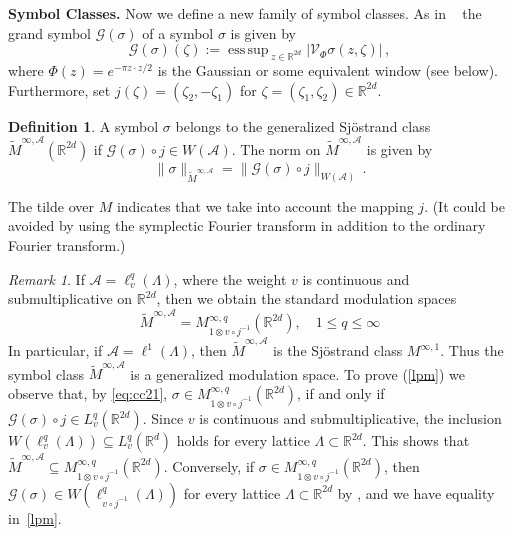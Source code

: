 \documentclass[12pt]{amsart}
\theoremstyle{definition}
\newtheorem{definition}{Definition}[section]
\theoremstyle{remark}
\newtheorem{remark}{Remark}[section]
\numberwithin{equation}{section}
\newcommand{\modsp}{modulation space}
\newcommand{\symbo}{\widetilde M^{\infty, \cA}}
\def\cG{\mathcal{G}}
\def\cA{\mathcal{A}}
\def\bR{{\mathbb{R}}}
\def\rd{\bR^d}
\def\rdd{{\bR^{2d}}}
\def\lrd{L^2(\rd)}
\def\cG{\mathcal{G}}
\def\cA{\mathcal{A}}
\def\cV{\mathcal{V}}
\newcommand{\fif}{if and only if}
\newcommand{\bc}{\mathbb{C}}
\newcommand{\Cal}{\mathcal}
\newcommand{\La}{\Lambda}
\newcommand{\ac}{\Cal A}
\newcommand{\gras}{\cG (\sigma )}
\DeclareMathOperator*{\esup}{ess\,sup\,}
\begin{document}

\textbf{Symbol Classes.}  Now we define a new family of symbol classes. As in
  ~\cite{grocomp}  the  grand symbol
$\gras$ of a symbol $\sigma $  is given by
\[
\gras(\zeta):=\esup _{z\in \rdd } |\cV _\Phi \sigma (z,\zeta )|\, ,
\]
where $\Phi(z) = e^{-\pi z\cdot z/2} $ is the Gaussian or some equivalent window (see below). Furthermore, set 
$j(\zeta)=(\zeta_2,-\zeta_1)$ for $\zeta=(\zeta_1,\zeta_2)\in  \rdd $.%

\begin{definition}\label{def:sjocl}  A symbol $\sigma$ belongs to the generalized
  Sj\"ostrand class 
$\widetilde M^{\infty,\ac}(\rdd )$ if $\gras\circ j\in W(\ac)$.
The norm on $\widetilde M^{\infty,\ac}$ is given
by 
$$\|\sigma\|_{\widetilde M^{\infty,\ac}}= \|\gras\circ j\|_{
W(\ac)}\, .
$$
\end{definition}


 The tilde over $M$ indicates that we take into
account the mapping $j$. (It could be avoided by using the symplectic
Fourier transform in addition to the ordinary Fourier transform.)

\begin{remark}
  If $\cA = \ell^q_v(\Lambda)$,
where the weight $v$ is continuous and submultiplicative on
$\rdd$, then   we obtain the  standard \modsp s 
\begin{equation}\label{lpm}
\widetilde M^{\infty,\ac}= M^{\infty,q}_{1\otimes v\circ
j^{-1}}(\rdd), \quad 1\le q\le \infty
\end{equation}
In particular, if $\cA = \ell ^1(\Lambda )$, then $\symbo $ is the
Sj\"ostrand class $M^{\infty ,1}$. 
Thus the symbol class $\widetilde M^{\infty,\ac}$ is a generalized
modulation space. To prove (\ref{lpm}) we observe that, by
\eqref{eq:cc21}, $\sigma\in M^{\infty,q}_{1\otimes v\circ
j^{-1}}(\rdd)$,  \fif\ $\gras\circ j\in L^q_{ v}(\rdd)$. Since $v$ is
continuous and submultiplicative, the inclusion 
 $W(\ell^q_v(\Lambda))\subseteq L^q_{ v}(\rd)$ holds for every
 lattice $\La\subset \rdd$. This shows that
$\widetilde M^{\infty,\ac}\subseteq M^{\infty,q}_{1\otimes v\circ
j^{-1}}(\rdd)$. Conversely,  if
$\sigma\in M^{\infty,q}_{1\otimes v\circ j^{-1}}(\rdd)$, then
$\gras\in W(\ell^q_{v\circ j^{-1}}(\La))$ for every 
lattice $\La\subset \rdd$ by  \cite[Thm~12.2.1]{book}, and we have
equality in~\eqref{lpm}.
\end{remark}
\end{document}
